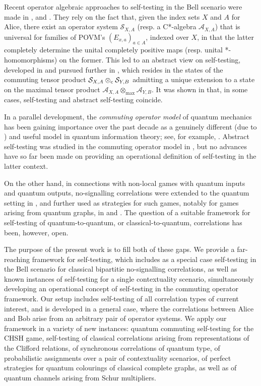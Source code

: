 \documentclass[11pt]{amsart}
\theoremstyle{definition}
\newcommand{\cl}[1]{\mathcal{#1}}
\begin{document}
Recent operator algebraic approaches to self-testing in the 
Bell scenario were made in \cite{mps}, \cite{pszz} and \cite{zhao}.
They rely on the fact that, given the index sets $X$ and $A$ for Alice, 
there exist an operator system $\cl S_{X,A}$ 
(resp. a C*-algebra $\cl A_{X,A}$) that 
is universal for families of POVM's $(E_{x,a})_{a\in A}$, 
indexed over $X$, in that the latter 
completely determine the unital completely positive maps 
(resp. unital *-homomorphisms) on the former. 
This led to an abstract view on self-testing, developed in 
\cite{pszz} and pursued further in \cite{zhao}, which resides in 
the states of the commuting tensor product $\cl S_{X,A}\otimes_{\rm c} \cl S_{Y,B}$ 
\cite{KPTT11} admitting a unique extension to a state on the 
maximal tensor product $\cl A_{X,A}\otimes_{\max} \cl A_{Y,B}$. 
It was shown in \cite{pszz} that, in some cases, self-testing and abstract 
self-testing coincide. 

In a parallel development, the \emph{commuting operator model}
of quantum mechanics has been gaining importance over 
the past decade  
as a genuinely different (due to \cite{jnvwy}) and useful model 
in quantum information theory; see, for example, \cite{cklt, cltt, psstw, pt}. 
Abstract self-testing was studied in the commuting operator model 
in \cite{pszz}, but no advances have so far been made on providing an  
operational definition of self-testing in the latter context. 

On the other hand, 
in connections with non-local games with quantum inputs and quantum outputs, 
no-signalling correlations were extended to the quantum setting in 
\cite{tt-QNS}, and further used as strategies for such games, 
notably for games arising from quantum graphs, in \cite{bhtt-JFA}
and \cite{bhtt-Adv}. The question of a 
suitable framework for self-testing of quantum-to-quantum, or
classical-to-quantum, correlations has been, however, open. 

The purpose of the present work is to fill both of these gaps. 
We provide a far-reaching framework for self-testing, which includes 
as a special case self-testing in the Bell scenario for 
classical bipartitie no-signalling correlations, as well as  
known instances of self-testing for a single contextuality scenario, 
simultaneously developing an operational concept of self-testing 
in the commuting operator framework. 
Our setup includes self-testing of all correlation types of current interest, 
and is developed in a general case, where the correlations between Alice and Bob 
arise from an arbitrary pair of operator systems. 
We apply our framework in a variety of 
new instances: quantum commuting self-testing for the CHSH game, 
self-testing of classical correlations arising from 
representations of the Clifford relations, of synchronous correlations
of quantum type, of probabilistic assignments over a pair of 
contextuality scenarios, of perfect strategies for quantum colourings
of classical complete graphs, as well as of quantum channels 
arising from Schur multipliers. 
\end{document}
